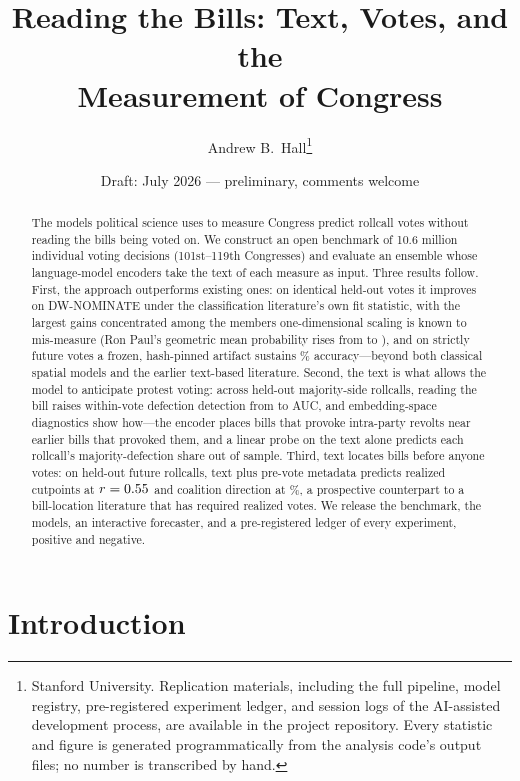 \documentclass[12pt]{article}
\title{Reading the Bills: Text, Votes, and the\\ Measurement of Congress}
\author{Andrew B.\ Hall\thanks{Stanford University. Replication materials,
including the full pipeline, model registry, pre-registered experiment
ledger, and session logs of the AI-assisted development process, are
available in the project repository. Every statistic and figure is
generated programmatically from the analysis code's output files; no
number is transcribed by hand.}}
\date{Draft: July 2026 --- preliminary, comments welcome}
\begin{document}
\maketitle
\onehalfspacing

\begin{abstract}
\noindent The models political science uses to measure Congress
predict rollcall votes without reading the bills being voted on. We
construct an open benchmark of 10.6 million individual voting
decisions (101st--119th Congresses) and evaluate an ensemble whose
language-model encoders take the text of each measure as input. Three
results follow. First, the approach outperforms existing ones: on
identical held-out votes it improves on DW-NOMINATE under the
classification literature's own fit statistic, with the largest gains
concentrated among the members one-dimensional scaling is known to
mis-measure (Ron Paul's geometric mean probability rises from
\paulGMPnom{} to \paulGMPours), and on strictly future votes a frozen,
hash-pinned artifact sustains \champForecastAcc\% accuracy---beyond
both classical spatial models and the earlier text-based literature.
Second, the text is what allows the model to anticipate protest
voting: across \protRC{} held-out majority-side rollcalls, reading
the bill raises within-vote defection detection from \protAUCnotext{}
to \protAUCtext{} AUC, and embedding-space diagnostics show how---the
encoder places bills that provoke intra-party revolts near earlier
bills that provoked them, and a linear probe on the text alone
predicts each rollcall's majority-defection share out of sample.
Third, text locates bills before anyone votes: on \cutTestN{}
held-out future rollcalls, text plus pre-vote metadata predicts
realized cutpoints at $r = 0.55$ and coalition direction at
\dirCombo\%, a prospective counterpart to a bill-location literature
that has required realized votes. We release the benchmark, the
models, an interactive forecaster, and a pre-registered ledger of
every experiment, positive and negative.
\end{abstract}

\section{Introduction}
\end{document}
